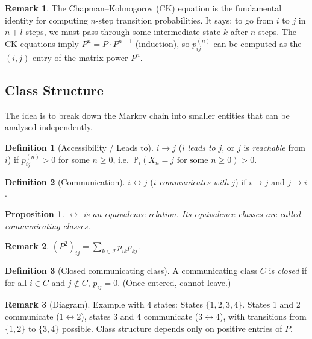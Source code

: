 \documentclass[12pt, a4paper]{article}
\theoremstyle{definition}
\newtheorem{definition}{Definition}[section]
\newtheorem{remark}{Remark}[section]
\theoremstyle{plain}
\newtheorem{proposition}{Proposition}[section]
\newcommand{\PP}{\mathbb{P}}
\newcommand{\II}{\mathcal{I}}
\begin{document}
\begin{remark}
The Chapman--Kolmogorov (CK) equation is the fundamental identity for computing $n$-step transition probabilities. It says: to go from $i$ to $j$ in $n+l$ steps, we must pass through some intermediate state $k$ after $n$ steps. The CK equations imply $P^n = P \cdot P^{n-1}$ (induction), so $p_{ij}^{(n)}$ can be computed as the $(i,j)$ entry of the matrix power $P^n$.
\end{remark}

\subsection{Class Structure}

The idea is to break down the Markov chain into smaller entities that can be analysed independently.

\begin{definition}[Accessibility / Leads to]
$i \to j$ ($i$ \emph{leads to} $j$, or $j$ is \emph{reachable} from $i$) if $p_{ij}^{(n)} > 0$ for some $n \ge 0$, i.e.\ $\PP_i(X_n = j \text{ for some } n \ge 0) > 0$.
\end{definition}

\begin{definition}[Communication]
$i \leftrightarrow j$ ($i$ \emph{communicates with} $j$) if $i \to j$ and $j \to i$.
\end{definition}

\begin{proposition}
$\leftrightarrow$ is an equivalence relation. Its equivalence classes are called \emph{communicating classes}.
\end{proposition}

\begin{remark}
$(P^2)_{ij} = \sum_{k \in \II} p_{ik} p_{kj}$.
\end{remark}

\begin{definition}[Closed communicating class]
A communicating class $C$ is \emph{closed} if for all $i \in C$ and $j \notin C$, $p_{ij} = 0$. (Once entered, cannot leave.)
\end{definition}

\begin{remark}[Diagram]
Example with 4 states: States $\{1,2,3,4\}$. States 1 and 2 communicate ($1 \leftrightarrow 2$), states 3 and 4 communicate ($3 \leftrightarrow 4$), with transitions from $\{1,2\}$ to $\{3,4\}$ possible. Class structure depends only on positive entries of $P$.
\end{remark}
\end{document}
